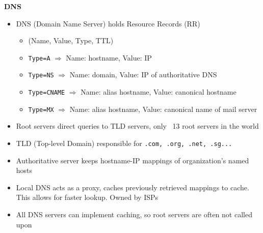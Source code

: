 \documentclass[a4paper]{article} \usepackage[backend=biber, style=numeric, sorting=none]{biblatex}
\begin{document}
\begin{multicols*}{4}
\textbf{DNS}
\begin{itemize}[leftmargin=*]
\item DNS (Domain Name Server) holds Resource Records (RR)
  \begin{itemize}[leftmargin=*]
  \item (Name, Value, Type, TTL)
  \item \texttt{Type=A} $\Rightarrow$ Name: hostname, Value: IP
  \item \texttt{Type=NS} $\Rightarrow$ Name: domain, Value: IP of authoritative DNS
  \item \texttt{Type=CNAME} $\Rightarrow$ Name: alias hostname, Value: canonical hostname
  \item \texttt{Type=MX} $\Rightarrow$ Name: alias hostname, Value: canonical name of mail server
  \end{itemize}
\item Root servers direct queries to TLD servers, only ~13 root servers in the world
\item TLD (Top-level Domain) responsible for \texttt{.com, .org, .net, .sg...}
\item Authoritative server keeps hostname-IP mappings of organization's named hosts
\item Local DNS acts as a proxy, caches previously retrieved mappings to cache. This allows for faster lookup. Owned by ISPs
\item All DNS servers can implement caching, so root servers are often not called upon
\end{itemize}


\end{multicols*}
\end{document}
